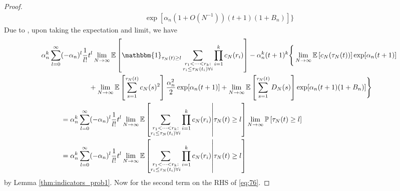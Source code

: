 \documentclass{article}
\newcommand{\Prob}{\mathbb{P}}
\newcommand{\E}{\mathbb{E}}
\newcommand{\1}[1]{\mathbbm{1}_{#1}}
\begin{document}
\begin{proof}
\begin{align}
\exp[ \alpha_n (1 + O(N^{-1}) ) (t+1) (1 + B_n) ] \Bigg\}
\end{align}
Due to \citet[Equations (3.3)--(3.5)]{brown2021}, upon taking the expectation and limit, we have
\begin{align}
\alpha_n^k \sum_{l=0}^{\infty} &(-\alpha_n)^l \frac{1}{l!} t^l 
\lim_{N\to\infty}\E \left[ \1{\tau_N(t) \geq l}
\sum_{\substack{r_1 <\dots< r_k :\\ r_i \leq \tau_N(t_i) \forall i}} \prod_{i=1}^k c_N(r_i) \right] 
- \alpha_n^k (t+1)^k
\Bigg\{ \lim_{N\to\infty}\E\left[c_N(\tau_N(t)) \right] \exp[ \alpha_n (t+1) ] \notag\\
 &\qquad\qquad+  \lim_{N\to\infty}\E\left[ \sum_{s=1}^{\tau_N(t)} c_N(s)^2 \right]
\frac{\alpha_n^2}{2} \exp[ \alpha_n (t+1) ]
+ \lim_{N\to\infty}\E\left[ \sum_{s=1}^{\tau_N(t)} D_N(s) \right]
\exp[ \alpha_n (t+1) (1 + B_n) ] \Bigg\} \notag\\
&= \alpha_n^k \sum_{l=0}^{\infty} (-\alpha_n)^l \frac{1}{l!} t^l 
\lim_{N\to\infty}\E \left[ \sum_{\substack{r_1 <\dots< r_k :\\ r_i \leq \tau_N(t_i) \forall i}} \prod_{i=1}^k c_N(r_i) \middle| \tau_N(t) \geq l \right] 
\lim_{N\to\infty}\Prob\left[ \tau_N(t) \geq l \right] \notag\\
&= \alpha_n^k \sum_{l=0}^{\infty} (-\alpha_n)^l \frac{1}{l!} t^l 
\lim_{N\to\infty}\E \left[ \sum_{\substack{r_1 <\dots< r_k :\\ r_i \leq \tau_N(t_i) \forall i}} \prod_{i=1}^k c_N(r_i) \middle| \tau_N(t) \geq l \right] \label{eq:78a}
\end{align}
by Lemma \ref{thm:indicators_prob1}.
Now for the second term on the RHS of \eqref{eq:76}.

\end{proof}
\end{document}
